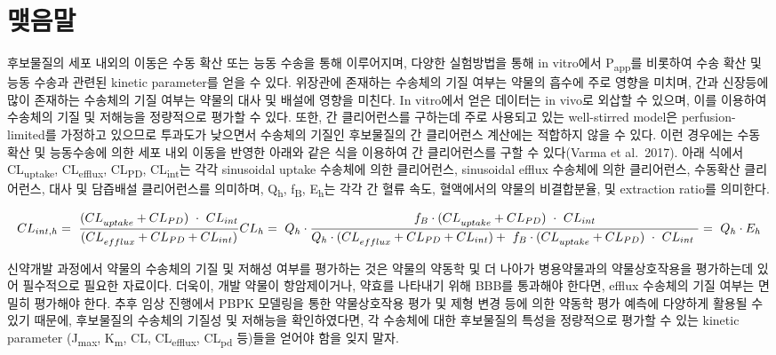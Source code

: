 \documentclass[
  11pt,
  krantz2, a4paper, twoside]{krantz}
\begin{document}
\hypertarget{uxb9fauxc74cuxb9d0-4}{%
\section{맺음말}\label{uxb9fauxc74cuxb9d0-4}}

후보물질의 세포 내외의 이동은 수동 확산 또는 능동 수송을 통해
이루어지며, 다양한 실험방법을 통해 in vitro에서 P\textsubscript{app}를 비롯하여 수송
확산 및 능동 수송과 관련된 kinetic parameter를 얻을 수 있다. 위장관에
존재하는 수송체의 기질 여부는 약물의 흡수에 주로 영향을 미치며, 간과
신장등에 많이 존재하는 수송체의 기질 여부는 약물의 대사 및 배설에 영향을
미친다. In vitro에서 얻은 데이터는 in vivo로 외삽할 수 있으며, 이를
이용하여 수송체의 기질 및 저해능을 정량적으로 평가할 수 있다. 또한, 간
클리어런스를 구하는데 주로 사용되고 있는 well-stirred model은
perfusion-limited를 가정하고 있으므로 투과도가 낮으면서 수송체의 기질인
후보물질의 간 클리어런스 계산에는 적합하지 않을 수 있다. 이런 경우에는
수동확산 및 능동수송에 의한 세포 내외 이동을 반영한 아래와 같은 식을
이용하여 간 클리어런스를 구할 수 있다(Varma et al.~2017). 아래 식에서
CL\textsubscript{uptake}, CL\textsubscript{efflux}, CL\textsubscript{PD}, CL\textsubscript{int}는 각각 sinusoidal uptake
수송체에 의한 클리어런스, sinusoidal efflux 수송체에 의한 클리어런스,
수동확산 클리어런스, 대사 및 담즙배설 클리어런스를 의미하며, Q\textsubscript{h}, f\textsubscript{B},
E\textsubscript{h}는 각각 간 혈류 속도, 혈액에서의 약물의 비결합분율, 및 extraction
ratio를 의미한다.

\[
{CL}_{int,h} = \ \frac{{(CL}_{uptake} + {CL}_{PD})\  \cdot \ {CL}_{int}}{{(CL}_{efflux} + {CL}_{PD} + {CL}_{int})} \\
{CL}_{h} = \ Q_{h} \cdot \frac{f_{B} \cdot {(CL}_{uptake} + {CL}_{PD})\  \cdot \ {CL}_{int}}{{Q_{h} \cdot (CL}_{efflux} + {CL}_{PD} + {CL}_{int}) + \ f_{B} \cdot {(CL}_{uptake} + {CL}_{PD})\  \cdot \ {CL}_{int}\ } = \ Q_{h} \cdot E_{h}
\]

신약개발 과정에서 약물의 수송체의 기질 및 저해성 여부를 평가하는 것은
약물의 약동학 및 더 나아가 병용약물과의 약물상호작용을 평가하는데 있어
필수적으로 필요한 자료이다. 더욱이, 개발 약물이 항암제이거나, 약효를
나타내기 위해 BBB를 통과해야 한다면, efflux 수송체의 기질 여부는 면밀히
평가해야 한다. 추후 임상 진행에서 PBPK 모델링을 통한 약물상호작용 평가
및 제형 변경 등에 의한 약동학 평가 예측에 다양하게 활용될 수 있기
때문에, 후보물질의 수송체의 기질성 및 저해능을 확인하였다면, 각 수송체에
대한 후보물질의 특성을 정량적으로 평가할 수 있는 kinetic parameter
(J\textsubscript{max}, K\textsubscript{m}, CL, CL\textsubscript{efflux}, CL\textsubscript{pd} 등)들을 얻어야 함을 잊지 말자.
\end{document}
